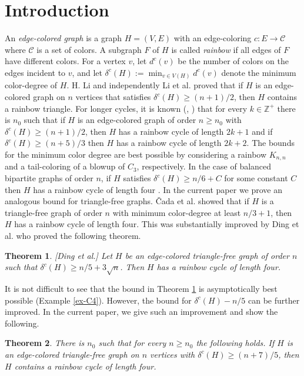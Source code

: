 \documentclass{article}
\newtheorem{theorem}{Theorem}[section]
\begin{document}
\section{Introduction}
An \textit{edge-colored graph} is a graph $H = (V, E)$ with an edge-coloring $c: E \to \mathcal{C}$ where $\mathcal{C}$ is  a set of colors. A subgraph $F$ of $H$ is called \textit{rainbow} if all edges of $F$  have different colors. 
For a vertex $v$, let $d^c(v)$ be the number of colors on the edges incident to $v$, and let $\delta^c(H):=\min_{v\in V(H)} d^c(v)$ denote the minimum color-degree of $H$. H. Li \cite{H-Li} and independently Li et al. \cite{LNXZ} proved that if $H$ is an edge-colored graph on $n$ vertices that satisfies $\delta^c(H)\geq (n+1)/2$, then $H$ contains a rainbow triangle. For longer cycles, it is known (\cite{CMNO-even}, \cite{CMNO-odd}) that for every $k\in \mathbb{Z}^+$ there is $n_0$  such that if $H$ is an edge-colored graph of order  $n\geq n_0$  with $\delta^c(H)\geq (n+1)/2$, then $H$ has a rainbow cycle of length ${2k+1}$ and if $\delta^c(H)\geq (n+5)/3$ then $H$ has a rainbow cycle of length ${2k+2}$. The bounds for the minimum color degree are best possible { by considering a rainbow $K_{n,n}$ and a tail-coloring of a blowup of $C_3$, respectively}. In the case of balanced bipartite graphs of order $n$, if $H$ satisfies $\delta^c(H)\geq n/6+C$ for some constant $C$ then $H$ has a rainbow cycle of length four \cite{CY}. In the current paper we prove an analogous bound for triangle-free graphs.
\v{C}ada et al. \cite{Cada} showed that if $H$ is a triangle-free  graph of order $n$ with minimum color-degree at least $n/3+1$, then $H$ has a rainbow cycle of length four. This was substantially improved by Ding et al. \cite{Ding} who proved the following theorem.
\begin{theorem}\label{thm-ding}[Ding et al.]
    Let $H$ be an edge-colored triangle-free graph of order $n$ such that $\delta^c(H)\geq n/5 +3\sqrt{n}$. Then $H$ has a rainbow cycle of length four.
\end{theorem}
It is not difficult to see that the bound in Theorem \ref{thm-ding} is asymptotically best possible (Example \ref{ex-C4}). However, the bound for $\delta^c(H)-n/5$ can be further improved. In the current paper, we give such an improvement and  show the following.
\begin{theorem}\label{rainbowC4-thm}
There is $n_0$  such that for every $n\geq n_0$ the following holds. If  $H$ is an edge-colored { triangle-free} graph on $n$ vertices with $\delta^c(H)\geq (n+7)/5$, then $H$ contains a rainbow cycle of length four.
\end{theorem}
\end{document}
